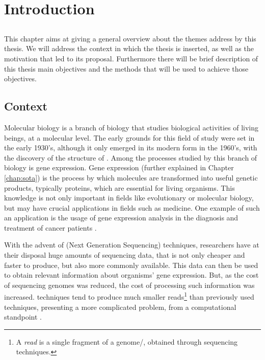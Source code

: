 \chapter{Introduction} \label{chap:intro}

\section*{}

This chapter aims at giving a general overview about the themes address by this
thesis. We will address the context in which the thesis is inserted, as well as
the motivation that led to its proposal. Furthermore there will be brief
description of this thesis main objectives and the methods that will be used to
achieve those objectives.

\section{Context} \label{sec:context}

Molecular biology is a branch of biology that studies biological activities of
living beings, at a molecular level. The early grounds for this field of study
were set in the early 1930's, although it only emerged in its modern form in the
1960's, with the discovery of the structure of \dna. Among the processes studied
by this branch of biology is gene expression. Gene expression (further explained
in Chapter \ref{chap:sota}) is the process by which \dna{} molecules are
transformed into useful genetic products, typically proteins, which are
essential for living organisms. This knowledge is not only important in fields
like evolutionary or molecular biology, but may have crucial applications in
fields such as medicine. One example of such an application is the usage of gene
expression analysis in the diagnosis and treatment of cancer patients
\cite{Pusztai01062003}.

With the advent of \ngs{} (Next Generation Sequencing) techniques, researchers
have at their disposal huge amounts of sequencing data, that is not only cheaper
and faster to produce, but also more commonly available. This data can then be
used to obtain relevant information about organisms' gene expression. But, as
the cost of sequencing genomes was reduced, the cost of processing such
information was increased. \ngs{} techniques tend to produce much smaller
reads\footnote{A \textit{read} is a single fragment of a genome/\trans, obtained
through sequencing techniques.} than previously used techniques, presenting a
more complicated problem, from a computational standpoint \cite{Wolf2013}.

